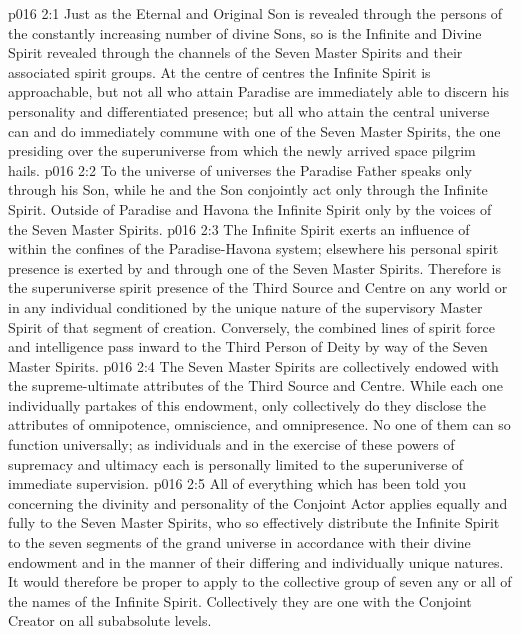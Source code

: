 \vs p016 2:1 Just as the Eternal and Original Son is revealed through the persons of the constantly increasing number of divine Sons, so is the Infinite and Divine Spirit revealed through the channels of the Seven Master Spirits and their associated spirit groups. At the centre of centres the Infinite Spirit is approachable, but not all who attain Paradise are immediately able to discern his personality and differentiated presence; but all who attain the central universe can and do immediately commune with one of the Seven Master Spirits, the one presiding over the superuniverse from which the newly arrived space pilgrim hails.
\vs p016 2:2 To the universe of universes the Paradise Father speaks only through his Son, while he and the Son conjointly act only through the Infinite Spirit. Outside of Paradise and Havona the Infinite Spirit  only by the voices of the Seven Master Spirits.
\vs p016 2:3 \pc The Infinite Spirit exerts an influence of  within the confines of the Paradise\hyp{}Havona system; elsewhere his personal spirit presence is exerted by and through one of the Seven Master Spirits. Therefore is the superuniverse spirit presence of the Third Source and Centre on any world or in any individual conditioned by the unique nature of the supervisory Master Spirit of that segment of creation. Conversely, the combined lines of spirit force and intelligence pass inward to the Third Person of Deity by way of the Seven Master Spirits.
\vs p016 2:4 \pc The Seven Master Spirits are collectively endowed with the supreme\hyp{}ultimate attributes of the Third Source and Centre. While each one individually partakes of this endowment, only collectively do they disclose the attributes of omnipotence, omniscience, and omnipresence. No one of them can so function universally; as individuals and in the exercise of these powers of supremacy and ultimacy each is personally limited to the superuniverse of immediate supervision.
\vs p016 2:5 All of everything which has been told you concerning the divinity and personality of the Conjoint Actor applies equally and fully to the Seven Master Spirits, who so effectively distribute the Infinite Spirit to the seven segments of the grand universe in accordance with their divine endowment and in the manner of their differing and individually unique natures. It would therefore be proper to apply to the collective group of seven any or all of the names of the Infinite Spirit. Collectively they are one with the Conjoint Creator on all subabsolute levels.

